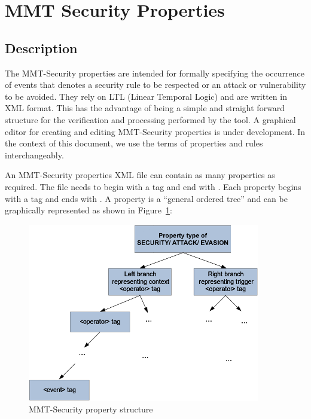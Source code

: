 \clearpage

\section{MMT Security Properties}
\label{Using}



\subsection{Description}

The MMT-Security properties are intended for formally specifying the occurrence of events that denotes a security rule to be respected or an attack or vulnerability to be avoided. They rely on LTL (Linear Temporal Logic) and are written in XML format. This has the
advantage of being a simple and straight forward structure for the verification and
processing performed by the tool. A graphical editor for creating and editing
MMT-Security properties is under development. In the context of this document, we use the terms of properties and rules interchangeably.


 An MMT-Security properties XML file can contain as many properties as required. The file needs to begin with a
 tag and end with
. Each property begins with a
 tag and ends with
. A property is a
{\textquotedblleft}general ordered tree{\textquotedblright} and can be
graphically represented as shown in Figure~\ref{rules}:


\begin{figure}[H]
\centering
\includegraphics[width=4in]{img/rules.png}
\caption{MMT-Security property structure}\label{rules}
\end{figure}


